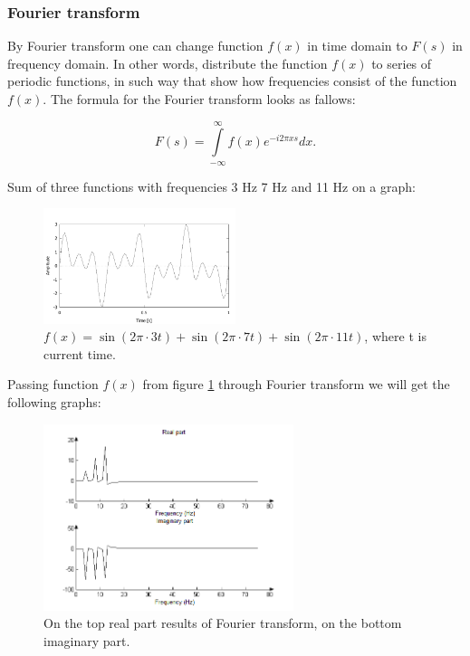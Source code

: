 \documentclass[11pt,titlepage]{article}
\theoremstyle{plain}
\begin{document}
\subsubsection{Fourier transform}
By Fourier transform one can change function $f(x)$ in time domain to $F(s)$ in frequency domain. In other words, distribute the function $f(x)$ to series of periodic functions, in such way that show how frequencies consist of the function $f(x)$. The formula for the Fourier transform looks as fallows:

\begin{equation}
	F(s) = \int\limits^\infty_{-\infty} f(x) e^{-i2\pi xs} dx.
\end{equation}

Sum of three functions with frequencies 3 Hz 7 Hz and 11 Hz on a graph:
\begin{figure}[H]
	\centering
	\includegraphics[width=0.5\textwidth]{img/sines}
	\caption{$f(x) = \sin(2\pi \cdot 3t)+\sin(2 \pi \cdot 7 t)+\sin(2  \pi \cdot 11  t)$, where t is current time.}
	\label{fig:F4}
\end{figure}

Passing function $f(x)$ from figure \ref{fig:F4} through Fourier transform we will get the following graphs:

\begin{figure}[H]
	\centering
	\includegraphics[width=0.65\textwidth]{img/both_real_imag}
	\caption{On the top real part results of Fourier transform, on the bottom imaginary part.}
	\label{fig:F5}
\end{figure}
\end{document}

